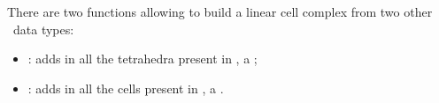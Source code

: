 
There are two functions allowing to build a linear cell complex
from two other \cgal\ data types:
\begin{itemize}
\item {}: adds in  all 
  the tetrahedra present in , a ;
\item {}: adds in  all 
  the cells present in , a .
\end{itemize}


